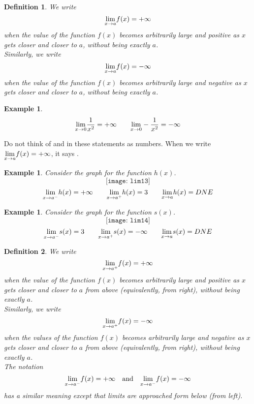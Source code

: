 \documentclass[12pt,a4paper]{book}
\newtheorem{Example}[theorem]{Example}
\numberwithin{equation}{section}
\newtheorem*{definition}{Definition}
\begin{document}
\begin{mdframed}
	\begin{definition}
		We write 
		$$\underset{x\rightarrow a}{\rm lim}f(x)=+\infty$$
		when the value of the function $f(x)$ becomes arbitrarily large and positive as $x$ gets closer and closer to $a$, without being exactly $a$.
		\\
		Similarly, we write 
		$$\underset{x\rightarrow a}{\rm lim}f(x)=-\infty$$
		when the value of the function $f(x)$ becomes arbitrarily large and negative as $x$ gets closer and closer to $a$, without being exactly $a$.
	\end{definition}
\end{mdframed}
\begin{Example}
	$$\underset{x\rightarrow 0}{\rm lim}\frac{1}{x^2}=+\infty \quad  \quad \underset{x\rightarrow 0}{\rm lim}-\frac{1}{x^2}=-\infty$$
\end{Example}

 Do not think of \say{$+\infty$} and \say{$-\infty$} in these statements as numbers. When we write $\underset{x\rightarrow a}{\rm lim}f(x)=+\infty$, it says .
	
	\begin{Example}
	Consider the graph for the function $h(x)$.
	$$
	\texttt{[image: lim13]}
	$$
	$$
	\underset{x\rightarrow a^-}{\rm lim}h(x)=+\infty  \quad \quad 
	\underset{x\rightarrow a^+}{\rm lim}h(x)= 3 \quad \quad  	\underset{x\rightarrow a}{\rm lim}h(x)=DNE
	$$
\end{Example}	
	\begin{Example}
	Consider the graph for the function $s(x)$.
	$$
	\texttt{[image: lim14]}
	$$
	$$
	\underset{x\rightarrow a^-}{\rm lim}s(x)=3  \quad \quad 
	\underset{x\rightarrow a^+}{\rm lim}s(x)=-\infty \quad \quad  	\underset{x\rightarrow a}{\rm lim}s(x)=DNE
	$$
\end{Example}

\begin{mdframed}
\begin{definition}
	We write $$\underset{x\rightarrow a^+}{\rm lim}f(x)=+\infty$$ when the value of the function $f(x)$ becomes arbitrarily large and positive as $x$ gets closer and closer to $a$ from above (equivalently, from right), without being exactly $a$.\\
	Similarly, we write 
	$$\underset{x\rightarrow a^+}{\rm lim}f(x)=-\infty$$ when the values of the function $f(x)$ becomes arbitrarily large and negative as $x$ gets closer and closer to $a$ from above (equivalently, from right), without being exactly $a$. 
	\\
	The notation 
	$$ \underset{x\rightarrow a^-}{\rm lim}f(x)=+\infty \quad \text{and} \quad\underset{x\rightarrow a^-}{\rm lim}f(x)=-\infty $$ has a similar meaning except that limits are approached form below (from left).
\end{definition}
\end{mdframed}
\end{document}
